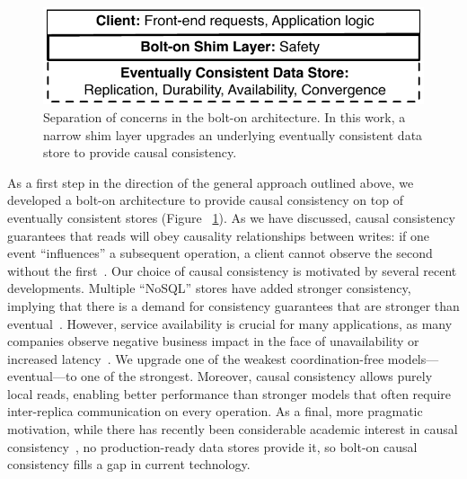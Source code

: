 

\begin{figure}[t!]
\centering
\includegraphics[width=.6\columnwidth]{figs/sep-concerns.pdf}\vspace{1em}
\caption{Separation of concerns in the bolt-on architecture. In this
  work, a narrow shim layer upgrades an underlying
  eventually consistent data store to provide causal consistency.}
\label{fig:sepconcerns}
\end{figure}

As a first step in the direction of the general approach outlined
above, we developed a bolt-on architecture to provide causal
consistency on top of eventually consistent stores (Figure
~\ref{fig:sepconcerns}). As we have discussed, causal consistency
guarantees that reads will obey causality relationships between
writes: if one event ``influences'' a subsequent operation, a client
cannot observe the second without the first~\cite{causalmemory,
  lamportclocks}.  Our choice of causal consistency is motivated by
several recent developments. Multiple ``NoSQL'' stores have added
stronger consistency, implying that there is a demand for consistency
guarantees that are stronger than eventual~\cite{simpledb}. However,
service availability is crucial for many applications, as many
companies observe negative business impact in the face of
unavailability or increased latency~\cite{amazon-latency}. We upgrade
one of the weakest coordination-free models---eventual---to one of the
strongest.  Moreover, causal consistency allows purely local reads,
enabling better performance than stronger models that often require
inter-replica communication on every operation. As a final, more
pragmatic motivation, while there has recently been considerable
academic interest in causal consistency~\cite{explicit-socc, cops,
  cac}, no production-ready data stores provide it, so bolt-on causal
consistency fills a gap in current technology.

